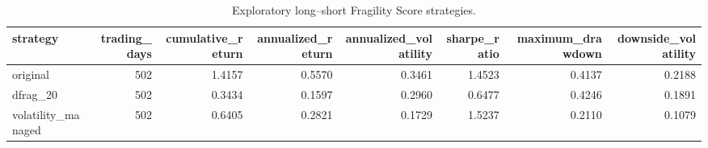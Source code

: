 \begin{table}
\caption{Exploratory long--short Fragility Score strategies.}
\label{tab:long-short-fragility-performance}
\begin{tabular}{lrrrrrrr}
\toprule
strategy & trading_days & cumulative_return & annualized_return & annualized_volatility & sharpe_ratio & maximum_drawdown & downside_volatility \\
\midrule
original & 502 & 1.4157 & 0.5570 & 0.3461 & 1.4523 & 0.4137 & 0.2188 \\
dfrag_20 & 502 & 0.3434 & 0.1597 & 0.2960 & 0.6477 & 0.4246 & 0.1891 \\
volatility_managed & 502 & 0.6405 & 0.2821 & 0.1729 & 1.5237 & 0.2110 & 0.1079 \\
\bottomrule
\end{tabular}
\end{table}
